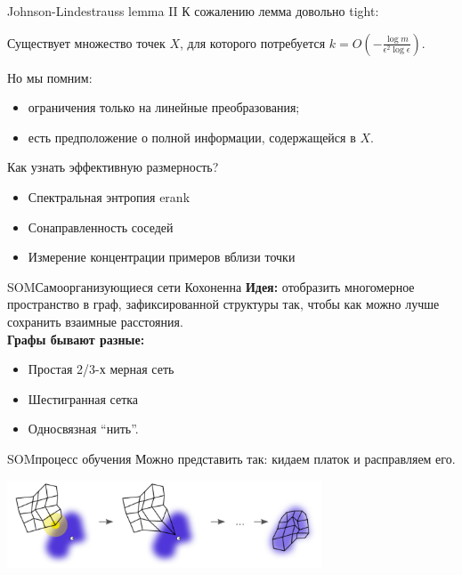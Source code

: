 \documentclass[14pt, fleqn, xcolor={dvipsnames, table}]{beamer}
\begin{document}
\begin{frame}{Johnson-Lindestrauss lemma II}
К сожалению лемма довольно tight:
\begin{theorem}{}
Существует множество точек $X$, для которого потребуется $k = O(-\frac{\log m}{\epsilon^2 \log \epsilon})$.
\end{theorem}
Но мы помним:
\begin{itemize}
  \item ограничения только на линейные преобразования;
  \item есть предположение о полной информации, содержащейся в $X$.
\end{itemize}
\end{frame}

\begin{frame}{Как узнать эффективную размерность?}
\begin{itemize}
  \item Спектральная энтропия erank
  \item Сонаправленность соседей
  \item Измерение концентрации примеров вблизи точки
\end{itemize}
\end{frame}

\begin{frame}{SOM}{Самоорганизующиеся сети Кохоненна}
\textbf{Идея:} отобразить многомерное пространство в граф, зафиксированной структуры так, чтобы как можно лучше сохранить взаимные расстояния. \\
\textbf{Графы бывают разные:}
\begin{itemize}
  \item Простая 2/3-х мерная сеть
  \item Шестигранная сетка
  \item Односвязная “нить”.
\end{itemize}
\end{frame}

\begin{frame}{SOM}{процесс обучения}
Можно представить так: кидаем платок и расправляем его.
\begin{center}\includegraphics[width=0.7\textwidth]{SOM.png}\end{center}
\end{frame}
\end{document}
